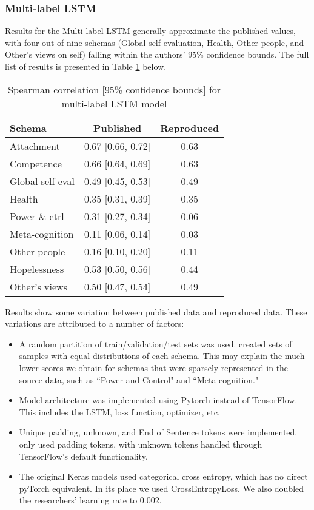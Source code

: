 \documentclass[11pt,a4paper]{article}
\begin{document}
\subsubsection{Multi-label LSTM}
\label{section:multi_rnn}
Results for the Multi-label LSTM generally approximate the published values, with four out of nine schemas (Global self-evaluation, Health, Other people, and Other's views on self) falling within the authors' 95\% confidence bounds. The full list of results is presented in Table \ref{tab:multi_lstm} below. 

\begin{table}[H]
\centering
\begin{tabular}{lcc}
\toprule
Schema                  &Published          &Reproduced \\ %
\midrule
Attachment              & 0.67 [0.66, 0.72] & 0.63 \\
Competence              & 0.66 [0.64, 0.69] & 0.63 \\
Global self-eval        & 0.49 [0.45, 0.53] & 0.49 \\
Health                  & 0.35 [0.31, 0.39] & 0.35 \\
Power \& ctrl           & 0.31 [0.27, 0.34] & 0.06 \\
Meta-cognition          & 0.11 [0.06, 0.14] & 0.03 \\
Other people            & 0.16 [0.10, 0.20] & 0.11 \\
Hopelessness            & 0.53 [0.50, 0.56] & 0.44 \\
Other's views           & 0.50 [0.47, 0.54] & 0.49 \\
\bottomrule
\end{tabular}
\caption{Spearman correlation [95\% confidence bounds] for multi-label LSTM model}
\label{tab:multi_lstm}
\end{table}

Results show some variation between published data and reproduced data. These variations are attributed to a number of factors: 
\begin{itemize}
  \item A random partition of train/validation/test sets was used. \citeauthor{burger_2021} created sets of samples with equal distributions of each schema. This may explain the much lower scores we obtain for schemas that were sparsely represented in the source data, such as ``Power and Control" and ``Meta-cognition."
  \item Model architecture was implemented using Pytorch instead of TensorFlow. This includes the LSTM, loss function, optimizer, etc.
  \item Unique padding, unknown, and End of Sentence tokens were implemented. \citeauthor{burger_2021} only used padding tokens, with unknown tokens handled through TensorFlow's default functionality.
  \item The original Keras models used categorical cross entropy, which has no direct pyTorch equivalent. In its place we used CrossEntropyLoss. We also doubled the researchers' learning rate to 0.002.
\end{itemize}
\end{document}
